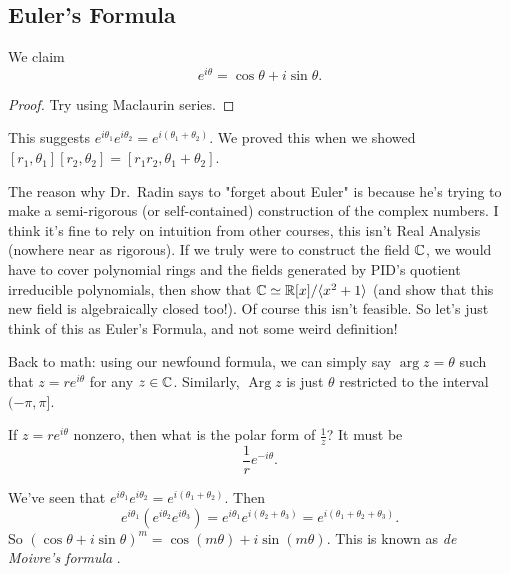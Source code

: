\subsection{Euler's Formula}
\begin{theorem}
    We claim \[
    e^{i\theta}=\cos\theta+i\sin\theta.
    \]
\end{theorem}
\begin{proof}
    Try using Maclaurin series.
\end{proof}
This suggests $e^{i\theta_1}e^{i\theta_2}=e^{i(\theta_1+\theta_2)}$. We proved this when we showed $[r_1,\theta_1][r_2,\theta_2]=[r_1r_2,\theta_1+\theta_2]$.

The reason why Dr.\ Radin says to "forget about Euler" is because he's trying to make a semi-rigorous (or self-contained) construction of the complex numbers. I think it's fine to rely on intuition from other courses, this isn't Real Analysis (nowhere near as rigorous). If we truly were to construct the field $\mathbb{C}$, we would have to cover polynomial rings and the fields generated by PID's quotient irreducible polynomials, then show that $\mathbb{C} \simeq \mathbb{R}[x]/\langle x^2+1 \rangle $ (and show that this new field is algebraically closed too!). Of course this isn't feasible. So let's just think of this as Euler's Formula, and not some weird definition!

Back to math: using our newfound formula, we can simply say $\operatorname{arg} z = \theta$ such that $z=re^{i\theta}$ for any $z\in \mathbb{C}$. Similarly, $\operatorname{Arg}z$ is just $\theta$ restricted to the interval  $(-\pi,\pi]$.
\begin{example}
    If $z=re^{i\theta}$ nonzero, then what is the polar form of $\frac{1}{z}$? It must be \[
    \frac{1}{r}e^{-i\theta}.
    \]
\end{example}
\begin{example}
 We've seen that $e^{i\theta_1}e^{i\theta_2}=e^{i(\theta_1+\theta_2)}$. Then \[
    e^{i\theta_1}\left( e^{i\theta_2}e^{i\theta_3} \right) =e^{i\theta_1}e^{i(\theta_2+\theta_3)}= e^{i(\theta_1+\theta_2+\theta_3)}.
\]
So $\left( \cos\theta+i\sin\theta \right)^{m}=\cos(m\theta)+i\sin(m\theta)$. This is known as \emph{de Moivre's formula} .   
\end{example}
